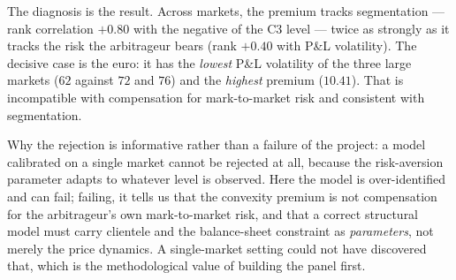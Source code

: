 \documentclass[11pt]{article}
\begin{document}
The diagnosis is the result. Across markets, the premium tracks segmentation --- rank correlation
$+0.80$ with the negative of the C3 level --- twice as strongly as it tracks the risk the arbitrageur
bears (rank $+0.40$ with P\&L volatility). The decisive case is the euro: it has the \emph{lowest}
P\&L volatility of the three large markets ($62$ against $72$ and $76$) and the \emph{highest} premium
($10.41$). That is incompatible with compensation for mark-to-market risk and consistent with
segmentation.

Why the rejection is informative rather than a failure of the project: a model calibrated on a single
market cannot be rejected at all, because the risk-aversion parameter adapts to whatever level is
observed. Here the model is over-identified and can fail; failing, it tells us that the convexity
premium is not compensation for the arbitrageur's own mark-to-market risk, and that a correct
structural model must carry clientele and the balance-sheet constraint as \emph{parameters}, not
merely the price dynamics. A single-market setting could not have discovered that, which is the
methodological value of building the panel first.
\end{document}
